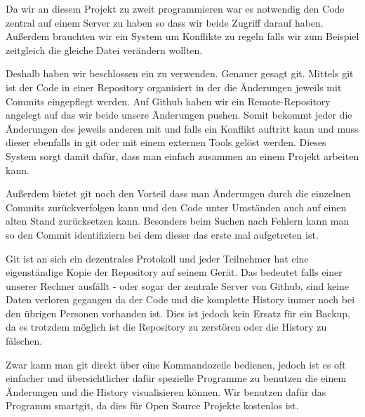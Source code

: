 
Da wir an diesem Projekt zu zweit programmieren war es notwendig den Code zentral auf einem Server zu haben so dass wir beide Zugriff darauf haben.
Außerdem brauchten wir ein System um Konflikte zu regeln falls wir zum Beispiel zeitgleich die gleiche Datei verändern wollten.

Deshalb haben wir beschlossen ein  zu verwenden. Genauer gesagt git\cite{GIT}. Mittels git ist der Code in einer Repository organisiert in der die Änderungen jeweils mit Commits eingepflegt werden. Auf Github haben wir ein Remote-Repository angelegt auf das wir beide unsere Änderungen pushen. Somit bekommt jeder die Änderungen des jeweils anderen mit und falls ein Konflikt auftritt kann und muss dieser ebenfalls in git oder mit einem externen Tools gelöst werden. Dieses System sorgt damit dafür, dass man einfach zusammen an einem Projekt arbeiten kann.


Außerdem bietet git noch den Vorteil dass man Änderungen durch die einzelnen Commits zurückverfolgen kann und den Code unter Umständen auch auf einen alten Stand zurücksetzen kann. Besonders beim Suchen nach Fehlern kann man so den Commit identifiziern bei dem dieser das erste mal aufgetreten ist. 

Git ist an sich ein dezentrales Protokoll und jeder Teilnehmer hat eine eigenständige Kopie der Repository auf seinem Gerät. Das bedeutet falls einer unserer Rechner ausfällt - oder sogar der zentrale Server von Github, sind keine Daten verloren gegangen da der Code und die komplette History immer noch bei den übrigen Personen vorhanden ist. Dies ist jedoch kein Ersatz für ein Backup, da es trotzdem möglich ist die Repository zu zerstören oder die History zu fälschen.

Zwar kann man git direkt über eine Kommandozeile bedienen, jedoch ist es oft einfacher und übersichtlicher dafür spezielle Programme zu benutzen die einem Änderungen und die History visualisieren können. Wir benutzen dafür das Programm smartgit, da dies für Open Source Projekte kostenlos ist.

